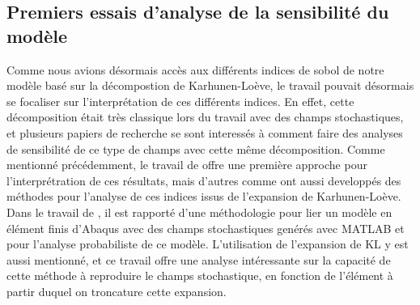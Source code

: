 \documentclass[a4paper,10pt]{article}
\begin{document}
\subsection{Premiers essais d'analyse de la sensibilité du modèle }

Comme nous avions désormais accès aux différents indices de sobol de notre modèle basé sur la décompostion de Karhunen-Loève, le travail pouvait désormais se focaliser sur l'interprétation de ces différents indices. En effet, cette décomposition était très classique lors du travail avec des champs stochastiques, et plusieurs papiers de recherche se sont interessés à comment faire des  analyses de sensibilité de ce type de champs avec cette même décomposition. Comme mentionné précédemment, le travail de \cite{Wei2017May} offre une première approche pour l'interprétration de ces résultats, mais d'autres comme \cite{Pronzato2019Jul} ont aussi developpés des méthodes pour l'analyse de ces indices issus de l'expansion de Karhunen-Loève. 
Dans le travail de \cite{shangStochastic2013}, il est rapporté d'une méthodologie pour lier un modèle en élément finis d'Abaqus avec des champs stochastiques genérés avec MATLAB et pour l'analyse probabiliste de ce modèle. L'utilisation de l'expansion de KL y est aussi mentionné, et ce travail offre une analyse intéressante sur la capacité de cette méthode à reproduire le champs stochastique, en fonction de l'élément à partir duquel on troncature cette expansion. 


\end{document}
